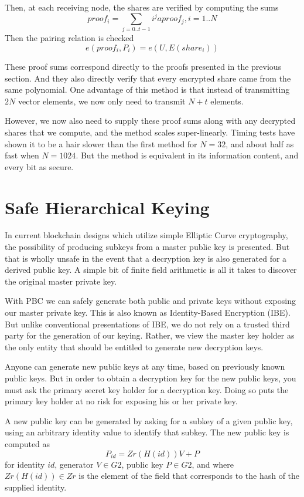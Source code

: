\documentclass[article,oneside]{memoir}
\begin{document}
Then, at each receiving node, the shares are verified by computing the sums
$$ proof_i = \sum_{j=0..t-1} i^j aproof_j, i = 1..N$$
Then the pairing relation is checked
$$e(proof_i, P_i) = e(U,E(share_i))$$

These proof sums correspond directly to the proofs presented in the previous section. And they also directly verify that every encrypted share came from the same polynomial. One advantage of this method is that instead of transmitting $2 N$ vector elements, we now only need to transmit $N+t$ elements.

However, we now also need to supply these proof sums along with any decrypted shares that we compute, and the method scales super-linearly. Timing tests have shown it to be a hair slower than the first method for $N=32$, and about half as fast when $N=1024$. But the method is equivalent in its information content, and every bit as secure.




\chapter{Safe Hierarchical Keying}

In current blockchain designs which utilize simple Elliptic Curve cryptography, the possibility of producing subkeys from a master public key is presented. But that is wholly unsafe in the event that a decryption key is also generated for a derived public key. A simple bit of finite field arithmetic is all it takes to discover the original master private key.

With PBC we can safely generate both public and private keys without exposing our master private key. This is also known as Identity-Based Encryption (IBE). But unlike conventional presentations of IBE, we do not rely on a trusted third party for the generation of our keying. Rather, we view the master key holder as the only entity that should be entitled to generate new decryption keys. 

Anyone can generate new public keys at any time, based on previously known public keys.
But in order to obtain a decryption key for the new public keys, you must ask the primary secret key holder for a decryption key. Doing so puts the primary key holder at no risk for exposing his or her private key.

A new public key can be generated by asking for a subkey of a given public key, using an arbitrary identity value to identify that subkey. The new public key is computed as $$ P_{id} = Zr(H(id)) V + P$$ for identity $id$, generator $V \in G2$, public key $P \in G2$, and where $Zr(H(id)) \in Zr$ is the element of the field that corresponds to the hash of the supplied identity. 
\end{document}
